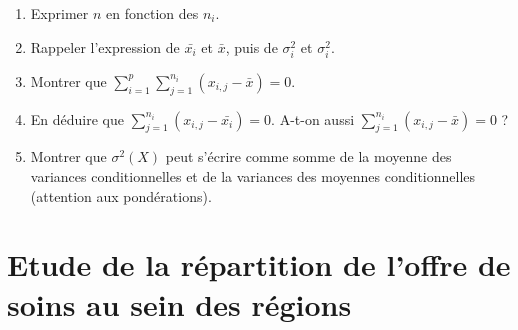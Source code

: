 \documentclass[a4paper,11pt]{article}
\begin{document}
\bigskip
\begin{enumerate}
  \item Exprimer $n$ en fonction des $n_i$.
  

  \item Rappeler l'expression de $\bar{x_i}$ et $\bar{x}$, puis de $\sigma_{i}^2$ et $\sigma_{i}^2$.
  


  



\item Montrer que $\sum_{i=1}^p \sum_{j=1}^{n_i} (x_{i,j}-\bar{x})=0$.


  \item En déduire que $\sum_{j=1}^{n_i} (x_{i,j}-\bar{x_i})=0$. A-t-on aussi $\sum_{j=1}^{n_i} (x_{i,j}-\bar{x})=0$ ?

  
 \item Montrer que $\sigma^2(X)$ peut s'écrire comme somme de la moyenne des variances conditionnelles et de la variances des moyennes conditionnelles (attention aux pondérations).
 
   

  \end{enumerate}
  

\section{Etude de la répartition de l'offre de soins au sein des régions}
\end{document}

